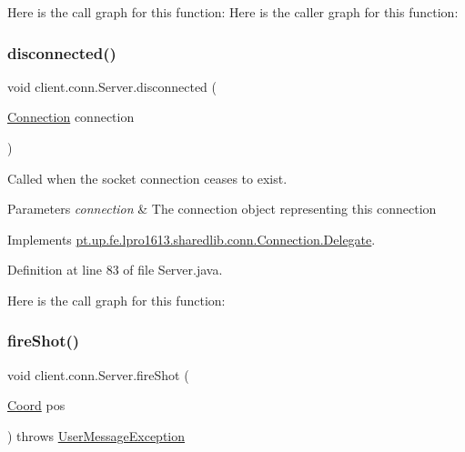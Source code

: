 Here is the call graph for this function\+:
Here is the caller graph for this function\+:
\hypertarget{classclient_1_1conn_1_1_server_ae2a0ab226b1622da8e19137fb89bdc81}{}\label{classclient_1_1conn_1_1_server_ae2a0ab226b1622da8e19137fb89bdc81} 
\subsubsection{\texorpdfstring{disconnected()}{disconnected()}}
{\footnotesize\ttfamily void client.\+conn.\+Server.\+disconnected (\begin{DoxyParamCaption}\item[{\hyperlink{classpt_1_1up_1_1fe_1_1lpro1613_1_1sharedlib_1_1conn_1_1_connection}{Connection}}]{connection }\end{DoxyParamCaption})}

Called when the socket connection ceases to exist.


\begin{DoxyParams}{Parameters}
{\em connection} & The connection object representing this connection \\
\hline
\end{DoxyParams}


Implements \hyperlink{interfacept_1_1up_1_1fe_1_1lpro1613_1_1sharedlib_1_1conn_1_1_connection_1_1_delegate_a39547a28a5b1818ca952e8d3d8da15ba}{pt.\+up.\+fe.\+lpro1613.\+sharedlib.\+conn.\+Connection.\+Delegate}.



Definition at line 83 of file Server.\+java.

Here is the call graph for this function\+:
\hypertarget{classclient_1_1conn_1_1_server_ab1d2fa19e855a803efff54edd2113d83}{}\label{classclient_1_1conn_1_1_server_ab1d2fa19e855a803efff54edd2113d83} 
\subsubsection{\texorpdfstring{fire\+Shot()}{fireShot()}}
{\footnotesize\ttfamily void client.\+conn.\+Server.\+fire\+Shot (\begin{DoxyParamCaption}\item[{\hyperlink{classpt_1_1up_1_1fe_1_1lpro1613_1_1sharedlib_1_1utils_1_1_coord}{Coord}}]{pos }\end{DoxyParamCaption}) throws \hyperlink{classpt_1_1up_1_1fe_1_1lpro1613_1_1sharedlib_1_1exceptions_1_1_user_message_exception}{User\+Message\+Exception}}

